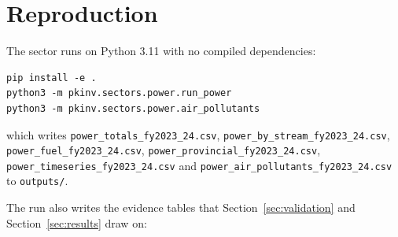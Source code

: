 \section{Reproduction}
\label{app:repro}

The sector runs on Python 3.11 with no compiled dependencies:

\begin{verbatim}
pip install -e .
python3 -m pkinv.sectors.power.run_power
python3 -m pkinv.sectors.power.air_pollutants
\end{verbatim}

which writes \texttt{power\_totals\_fy2023\_24.csv}, \texttt{power\_by\_stream\_fy2023\_24.csv},
\texttt{power\_fuel\_fy2023\_24.csv}, \texttt{power\_provincial\_fy2023\_24.csv},
\texttt{power\_timeseries\_fy2023\_24.csv} and \texttt{power\_air\_pollutants\_fy2023\_24.csv} to
\texttt{outputs/}.

The run also writes the evidence tables that Section~\ref{sec:validation} and
Section~\ref{sec:results} draw on:


